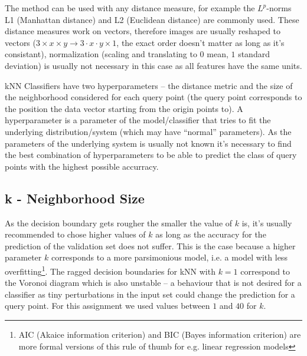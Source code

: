 The method can be used with any distance measure, for example the $L^p$-norms L1 (Manhattan distance) and L2 (Euclidean distance) are commonly used. These distance  measures work on vectors, therefore images are usually reshaped to vectors (${3 \times x \times y \to 3\cdot x \cdot y \times 1}$, the exact order doesn't matter as long as it's consistant), normalization (scaling and translating to $0$ mean, $1$ standard deviation) is usually not necessary in this case as all features have the same units. 

kNN Classifiers have two hyperparameters -- the distance metric and the size of the neighborhood considered for each query point (the query point corresponds to the position the data vector starting from the origin points to). A hyperparameter is a parameter of the model/classifier that tries to fit the underlying distribution/system (which may have ``normal'' parameters). As the parameters of the underlying system is usually not known it's necessary to find the best combination of hyperparameters to be able to predict the class of query points with the highest possible accurracy. 
\subsection{k - Neighborhood Size}
As the decision boundary gets rougher the smaller the value of $k$ is, it's usually recommended to chose higher values of $k$ as long as the accuracy for the prediction of the validation set does not suffer. This is the case because a higher parameter $k$ corresponds to a more parsimonious model, i.e. a model with less overfitting\footnote{AIC (Akaice information criterion) and BIC (Bayes information criterion) are more formal versions of this rule of thumb for e.g. linear regression models}. The ragged decision boundaries for kNN with $k =1$ correspond to the Voronoi diagram which is also unstable -- a behaviour that is not desired for a classifier as tiny perturbations in the input set could change the prediction for a query point. For this assignment we used values between $1$ and $40$ for $k$. 
